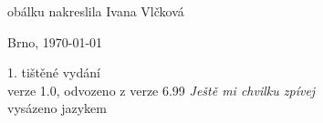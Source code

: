 \vspace*{\fill}
\hspace{10mm}obálku nakreslila Ivana Vlčková\\
\begin{otherlanguage}{czech}
Brno, \today\\
\end{otherlanguage}
1. tištěné vydání\\
verze 1.0, odvozeno z verze 6.99 \textit{Ještě mi chvilku zpívej}\\
vysázeno jazykem \LaTeXe
\vspace{2cm}
\newpage